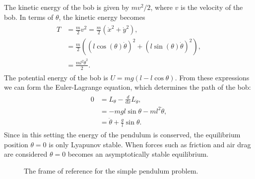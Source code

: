 The kinetic energy of the bob is given by $mv^2/2$, where $v$ is the velocity of the bob.
In terms of $\theta$, the kinetic energy becomes
\begin{align}
	\begin{split}
	T &= \frac{m}{2}v^2  = \frac{m}{2}(\dot{x}^2 + \dot{y}^2),\\
	&= \frac{m}{2}((l\cos(\theta)\dot{\theta})^2 + (l\sin(\theta)\dot{\theta})^2),\\
	&= \frac{ml^2\dot{\theta}^2}{2}.
	\end{split}
\end{align}
The potential energy of the bob is $U = mg(l-l\cos \theta)$.
From these expressions we can form the Euler-Lagrange equation, which determines the path of the bob:
\begin{align}
	\begin{split}
	0 &= L_{\theta} - \frac{d}{dx}L_{\dot{\theta}},\\
	&= -mgl\sin \theta - m l^2 \ddot{\theta},\\
	&= \ddot{\theta} + \frac{g}{l}\sin \theta.
	\end{split}
\end{align}
Since in this setting the energy of the pendulum is conserved, the equilibrium position $\theta = 0$ is only Lyapunov stable. When forces such as friction and air drag are considered $\theta = 0$ becomes an asymptotically stable equilibrium.


\begin{figure}
\begin{center}
\end{center}
\caption{The frame of reference for the simple pendulum problem.}
\label{fig:inverted_pendulum:simple_gravity_pendulum}
\end{figure}

